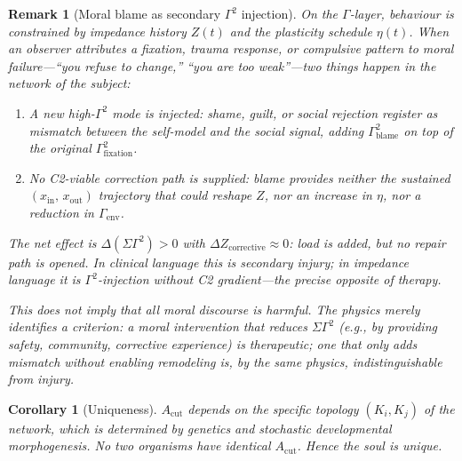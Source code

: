 \documentclass[aps,pre,twocolumn,superscriptaddress,floatfix]{revtex4-2}
\newtheorem{corollary}{Corollary}
\newtheorem{remark}{Remark}
\newcommand{\Acut}{A_{\text{cut}}}
\begin{document}
\begin{remark}[Moral blame as secondary $\Gamma^2$ injection]
\label{rem:secondary-injury}
On the $\Gamma$-layer, behaviour is constrained by
impedance history $Z(t)$ and the plasticity schedule
$\eta(t)$.
When an observer attributes a fixation, trauma response,
or compulsive pattern to moral failure---``you refuse to
change,'' ``you are too weak''---two things happen in the
network of the subject:
\begin{enumerate}
  \item A new high-$\Gamma^2$ mode is injected: shame,
    guilt, or social rejection register as mismatch
    between the self-model and the social signal,
    adding $\Gamma_{\text{blame}}^2$ on top of the
    original $\Gamma_{\text{fixation}}^2$.
  \item No C2-viable correction path is supplied:
    blame provides neither the sustained
    $(x_{\text{in}},\,x_{\text{out}})$ trajectory
    that could reshape $Z$, nor an increase in $\eta$,
    nor a reduction in $\Gamma_{\text{env}}$.
\end{enumerate}
The net effect is $\Delta(\Sigma\Gamma^2) > 0$ with
$\Delta Z_{\text{corrective}} \approx 0$: load is
added, but no repair path is opened.
In clinical language this is \emph{secondary injury};
in impedance language it is
$\Gamma^2$-injection without C2 gradient---the precise
opposite of therapy.

This does not imply that all moral discourse is harmful.
The physics merely identifies a \emph{criterion}:
a moral intervention that reduces $\Sigma\Gamma^2$
(e.g., by providing safety, community, corrective
experience) is therapeutic;
one that only adds mismatch without enabling remodeling
is, by the same physics, indistinguishable from injury.
\end{remark}

\begin{corollary}[Uniqueness]
$\Acut$ depends on the specific topology $(K_i,K_j)$ of the
network, which is determined by genetics and stochastic
developmental morphogenesis.
No two organisms have identical $\Acut$.
Hence the soul is unique.
\end{corollary}
\end{document}
